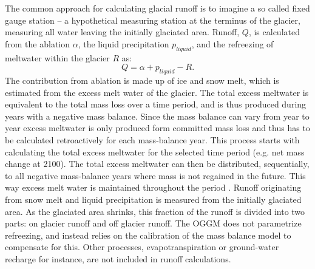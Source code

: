 \documentclass[12pt, a4paper]{article}
\begin{document}
The common approach for calculating glacial runoff is to imagine a so called
fixed gauge station -- a hypothetical measuring station at the terminus of the
glacier, measuring all water leaving the initially glaciated area. Runoff, $Q$,
is calculated from the ablation $\alpha$, the liquid precipitation $p_{liquid}$,
and the refreezing of meltwater within the glacier $R$ as:
\begin{equation}
    Q = \alpha + p_{liquid} - R.
\end{equation}
The contribution from ablation is made up of ice and snow melt, which is
estimated from the excess melt water of the glacier. The total excess meltwater
is equivalent to the total mass loss over a time period, and is thus produced
during years with a negative mass balance. Since the mass balance can vary from
year to year excess meltwater is only produced form committed mass loss and thus
has to be calculated retroactively for each mass-balance year. This process
starts with calculating the total excess meltwater for the selected time period
(e.g. net mass change at 2100). The total excess meltwater can then be
distributed, sequentially, to all negative mass-balance years where mass is not
regained in the future. This way excess melt water is maintained throughout the
period \parencite{rounceGlacierMassChange2020}. Runoff originating from snow
melt and liquid precipitation is measured from the initially glaciated area. As
the glaciated area shrinks, this fraction of the runoff is divided into two
parts: on glacier runoff and off glacier runoff. The OGGM does not parametrize
refreezing, and instead relies on the calibration of the mass balance model to
compensate for this. Other processes, evapotranspiration or ground-water
recharge for instance, are not included in runoff calculations.
\end{document}
